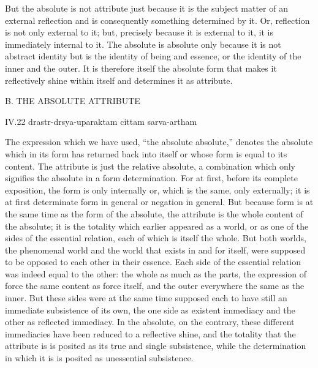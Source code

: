 But the absolute is not attribute just because
it is the subject matter of an external reflection
and is consequently something determined by it.
Or, reflection is not only external to it;
but, precisely because it is external to it,
it is immediately internal to it.
The absolute is absolute only because
it is not abstract identity
but is the identity of being and essence,
or the identity of the inner and the outer.
It is therefore itself the absolute form that makes it
reflectively shine within itself and determines it as attribute.

B. THE ABSOLUTE ATTRIBUTE

IV.22
drastr-drsya-uparaktam cittam sarva-artham

The expression which we have used, “the absolute absolute,”
denotes the absolute which in its form has returned back into itself
or whose form is equal to its content.
The attribute is just the relative absolute,
a combination which only signifies the absolute
in a form determination.
For at first, before its complete exposition,
the form is only internally or, which is the same, only externally;
it is at first determinate form in general or negation in general.
But because form is at the same time as the form of the absolute,
the attribute is the whole content of the absolute;
it is the totality which earlier appeared as a world,
or as one of the sides of the essential relation,
each of which is itself the whole.
But both worlds, the phenomenal world
and the world that exists in and for itself,
were supposed to be opposed to each other in their essence.
Each side of the essential relation was indeed equal to the other:
the whole as much as the parts,
the expression of force the same content as force itself,
and the outer everywhere the same as the inner.
But these sides were at the same time supposed each to have still
an immediate subsistence of its own,
the one side as existent immediacy
and the other as reflected immediacy.
In the absolute, on the contrary,
these different immediacies have been
reduced to a reflective shine,
and the totality that the attribute is
is posited as its true and single subsistence,
while the determination in which it is
is posited as unessential subsistence.

